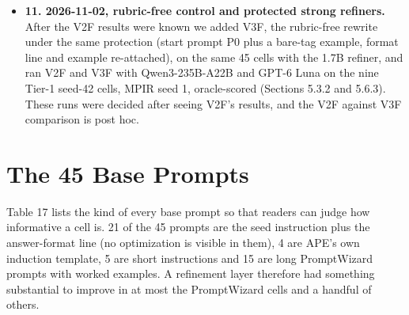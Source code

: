 \documentclass{ieeeaccess}
\begin{document}
\begin{itemize}
\item \textbf{11. 2026-11-02, rubric-free control and protected strong refiners.} After the V2F results were known we added V3F, the rubric-free rewrite under the same protection (start prompt P0 plus a bare-tag example, format line and example re-attached), on the same 45 cells with the 1.7B refiner, and ran V2F and V3F with Qwen3-235B-A22B and GPT-6 Luna on the nine Tier-1 seed-42 cells, MPIR seed 1, oracle-scored (Sections 5.3.2 and 5.6.3). These runs were decided after seeing V2F's results, and the V2F against V3F comparison is post hoc.
\end{itemize}

\section{The 45 Base Prompts}

Table 17 lists the kind of every base prompt so that readers can judge how informative a cell is. 21 of the 45 prompts are the seed instruction plus the answer-format line (no optimization is visible in them), 4 are APE's own induction template, 5 are short instructions and 15 are long PromptWizard prompts with worked examples. A refinement layer therefore had something substantial to improve in at most the PromptWizard cells and a handful of others.
\end{document}

